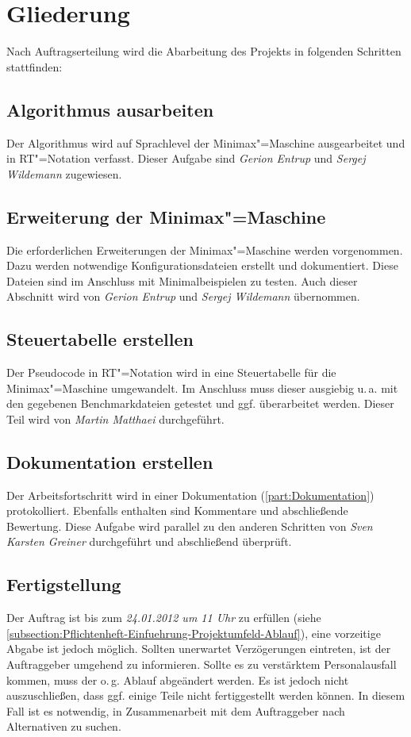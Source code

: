 \section{Gliederung}
\label{section:Pflichtenheft-SystemtechnischeLoesung-Gliederung}

Nach Auftragserteilung wird die Abarbeitung des Projekts in folgenden Schritten stattfinden:

\subsection{Algorithmus ausarbeiten}
Der Algorithmus wird auf Sprachlevel der Minimax"=Maschine ausgearbeitet und in RT"=Notation verfasst. Dieser Aufgabe sind \emph{Gerion Entrup} und \emph{Sergej Wildemann} zugewiesen.

\subsection{Erweiterung der Minimax"=Maschine}
Die erforderlichen Erweiterungen der Minimax"=Maschine werden vorgenommen. Dazu werden notwendige Konfigurationsdateien erstellt und dokumentiert. Diese Dateien sind im Anschluss mit Minimalbeispielen zu testen. Auch dieser Abschnitt wird von \emph{Gerion Entrup} und \emph{Sergej Wildemann} übernommen.

\subsection{Steuertabelle erstellen}
Der Pseudocode in RT"=Notation wird in eine Steuertabelle für die Minimax"=Maschine umgewandelt. Im Anschluss muss dieser ausgiebig u.\,a. mit den gegebenen Benchmarkdateien getestet und ggf. überarbeitet werden. Dieser Teil wird von \emph{Martin Matthaei} durchgeführt.

\subsection{Dokumentation erstellen}
Der Arbeitsfortschritt wird in einer Dokumentation (\autoref{part:Dokumentation}) protokolliert. Ebenfalls enthalten sind Kommentare und abschließende Bewertung. Diese Aufgabe wird parallel zu den anderen Schritten von \emph{Sven Karsten Greiner} durchgeführt und abschließend überprüft.

\subsection{Fertigstellung}
Der Auftrag ist bis zum \emph{24.01.2012 um 11 Uhr} zu erfüllen (siehe \autoref{subsection:Pflichtenheft-Einfuehrung-Projektumfeld-Ablauf}), eine vorzeitige Abgabe ist jedoch möglich. Sollten unerwartet Verzögerungen eintreten, ist der Auftraggeber umgehend zu informieren. Sollte es zu verstärktem Personalausfall kommen, muss der o.\,g. Ablauf abgeändert werden. Es ist jedoch nicht auszuschließen, dass ggf. einige Teile nicht fertiggestellt werden können. In diesem Fall ist es notwendig, in Zusammenarbeit mit dem Auftraggeber nach Alternativen zu suchen.

